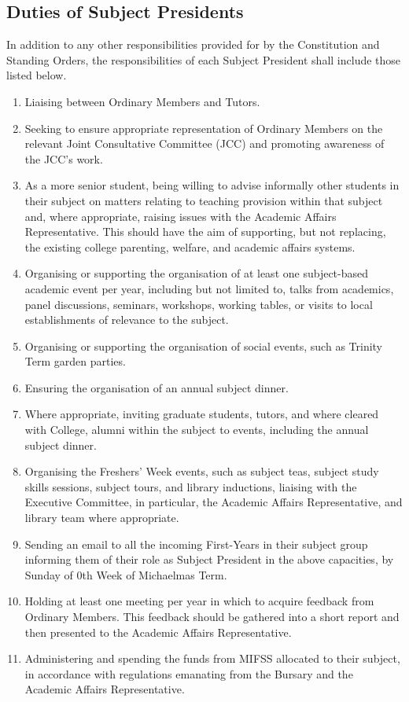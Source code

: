 \subsection{Duties of Subject Presidents} \label{ssec:roles_subjpres_duties}
In addition to any other responsibilities provided for by the Constitution and Standing Orders, the responsibilities of each Subject President shall include those listed below.
\begin{enumerate}
    \item Liaising between Ordinary Members and Tutors.
    \item Seeking to ensure appropriate representation of Ordinary Members on the relevant Joint Consultative Committee (JCC) and promoting awareness of the JCC's work.
    \item As a more senior student, being willing to advise informally other students in their subject on matters relating to teaching provision within that subject and, where appropriate, raising issues with the Academic Affairs Representative. This should have the aim of supporting, but not replacing, the existing college parenting, welfare, and academic affairs systems.
    \item Organising or supporting the organisation of at least one subject-based academic event per year, including but not limited to, talks from academics, panel discussions, seminars, workshops, working tables, or visits to local establishments of relevance to the subject.
    \item Organising or supporting the organisation of social events, such as Trinity Term garden parties.
    \item Ensuring the organisation of an annual subject dinner.
    \item Where appropriate, inviting graduate students, tutors, and where cleared with College, alumni within the subject to events, including the annual subject dinner.
    \item Organising the Freshers' Week events, such as subject teas, subject study skills sessions, subject tours, and library inductions, liaising with the Executive Committee, in particular, the Academic Affairs Representative, and library team where appropriate.
    \item Sending an email to all the incoming First-Years in their subject group informing them of their role as Subject President in the above capacities, by Sunday of 0th Week of Michaelmas Term.
    \item Holding at least one meeting per year in which to acquire feedback from Ordinary Members. This feedback should be gathered into a short report and then presented to the Academic Affairs Representative.
    \item Administering and spending the funds from MIFSS allocated to their subject, in accordance with regulations emanating from the Bursary and the Academic Affairs Representative.
\end{enumerate}
